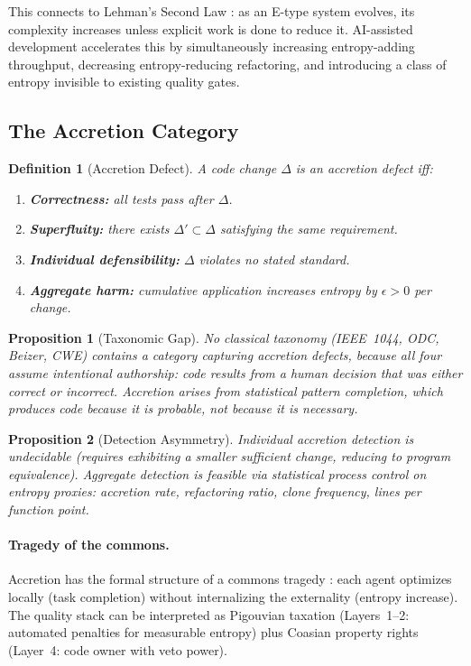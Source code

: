 \documentclass[11pt, a4paper, copyright]{googledeepmind}
\newtheorem{definition}{Definition}[section]
\newtheorem{proposition}{Proposition}[section]
\begin{document}
This connects to Lehman's Second Law \citep{lehman1980}: as an E-type system evolves, its complexity increases unless explicit work is done to reduce it. AI-assisted development accelerates this by simultaneously increasing entropy-adding throughput, decreasing entropy-reducing refactoring, and introducing a class of entropy invisible to existing quality gates.

\subsection{The Accretion Category}

\begin{definition}[Accretion Defect]
\label{def:accretion}
A code change $\Delta$ is an accretion defect iff:
\begin{enumerate}
\item \textbf{Correctness:} all tests pass after $\Delta$.
\item \textbf{Superfluity:} there exists $\Delta' \subset \Delta$ satisfying the same requirement.
\item \textbf{Individual defensibility:} $\Delta$ violates no stated standard.
\item \textbf{Aggregate harm:} cumulative application increases entropy by $\epsilon > 0$ per change.
\end{enumerate}
\end{definition}

\begin{proposition}[Taxonomic Gap]
\label{prop:taxgap}
No classical taxonomy (IEEE~1044, ODC, Beizer, CWE) contains a category capturing accretion defects, because all four assume intentional authorship: code results from a human decision that was either correct or incorrect. Accretion arises from statistical pattern completion, which produces code because it is \emph{probable}, not because it is \emph{necessary}.
\end{proposition}

\begin{proposition}[Detection Asymmetry]
Individual accretion detection is undecidable (requires exhibiting a smaller sufficient change, reducing to program equivalence). Aggregate detection is feasible via statistical process control on entropy proxies: accretion rate, refactoring ratio, clone frequency, lines per function point.
\end{proposition}

\paragraph{Tragedy of the commons.} Accretion has the formal structure of a commons tragedy \citep{hardin1968}: each agent optimizes locally (task completion) without internalizing the externality (entropy increase). The quality stack can be interpreted as Pigouvian taxation (Layers~1--2: automated penalties for measurable entropy) plus Coasian property rights (Layer~4: code owner with veto power).
\end{document}
